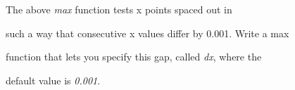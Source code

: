 The above \textit{max} function tests x points spaced out in

such a way that consecutive x values differ by 0.001. Write a max

function that lets you specify this gap, called \textit{dx}, where the

default value is \textit{0.001}.

